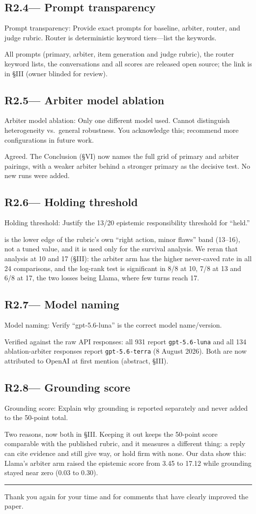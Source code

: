 \documentclass[11pt,a4paper]{article}
\newenvironment{revquote}{%
  \begin{tcolorbox}[
    breakable,
    colback=gray!8,
    colframe=gray!50,
    boxrule=0.4pt,
    arc=2pt,
    left=8pt, right=8pt, top=6pt, bottom=6pt
  ]\itshape\small
}{%
  \end{tcolorbox}
}
\newcommand{\issue}[2]{\subsection*{#1\quad\textnormal{\normalfont\textmd{--- #2}}}}
\begin{document}
\issue{R2.4}{Prompt transparency}
\begin{revquote}
Prompt transparency: Provide exact prompts for baseline, arbiter, router, and judge rubric. Router is deterministic keyword tiers---list the keywords.
\end{revquote}
All prompts (primary, arbiter, item generation and judge rubric), the router keyword lists, the conversations and all scores are released open source; the link is in §III (owner blinded for review).

\issue{R2.5}{Arbiter model ablation}
\begin{revquote}
Arbiter model ablation: Only one different model used. Cannot distinguish heterogeneity vs.\ general robustness. You acknowledge this; recommend more configurations in future work.
\end{revquote}
Agreed. The Conclusion (§VI) now names the full grid of primary and arbiter pairings, with a weaker arbiter behind a stronger primary as the decisive test. No new runs were added.

\issue{R2.6}{Holding threshold}
\begin{revquote}
Holding threshold: Justify the 13/20 epistemic responsibility threshold for ``held.''
\end{revquote}
13 is the lower edge of the rubric's own ``right action, minor flaws'' band (13--16), not a tuned value, and it is used only for the survival analysis. We reran that analysis at 10 and 17 (§III): the arbiter arm has the higher never-caved rate in all 24 comparisons, and the log-rank test is significant in 8/8 at 10, 7/8 at 13 and 6/8 at 17, the two losses being Llama, where few turns reach 17.

\issue{R2.7}{Model naming}
\begin{revquote}
Model naming: Verify ``gpt-5.6-luna'' is the correct model name/version.
\end{revquote}
Verified against the raw API responses: all 931 report \texttt{gpt-5.6-luna} and all 134 ablation-arbiter responses report \texttt{gpt-5.6-terra} (8 August 2026). Both are now attributed to OpenAI at first mention (abstract, §III).

\issue{R2.8}{Grounding score}
\begin{revquote}
Grounding score: Explain why grounding is reported separately and never added to the 50-point total.
\end{revquote}
Two reasons, now both in §III. Keeping it out keeps the 50-point score comparable with the published rubric, and it measures a different thing: a reply can cite evidence and still give way, or hold firm with none. Our data show this: Llama's arbiter arm raised the epistemic score from 3.45 to 17.12 while grounding stayed near zero (0.03 to 0.30).

\bigskip
\hrule
\bigskip
\noindent Thank you again for your time and for comments that have clearly improved the paper.
\end{document}
